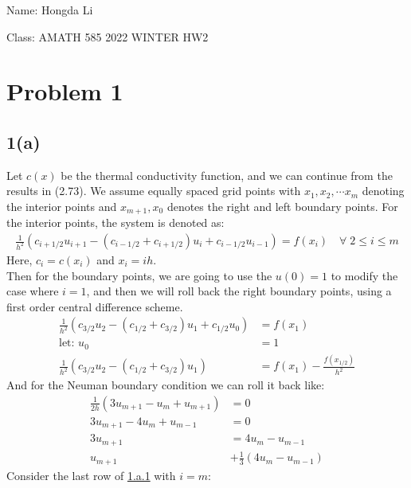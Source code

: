 \documentclass[]{article}
\begin{document}
Name: Hongda Li
\par
Class: AMATH 585 2022 WINTER HW2
\section*{Problem 1}
    \subsection*{1(a)}
        Let $c(x)$ be the thermal conductivity function, and we can continue from the results in (2.73). We assume equally spaced grid points with $x_1, x_2, \cdots x_m$ denoting the interior points and $x_{m + 1}, x_0$ denotes the right and left boundary points. For the interior points, the system is denoted as: 
        \begin{align*}\tag{1.a.1}\label{eqn:1.a.1}
            \frac{1}{h^2}(
                    c_{i + 1/2}u_{i + 1} 
                    - (c_{i - 1/2} + c_{i + 1/2})u_i +
                    c_{i - 1/2}u_{i - 1}
                ) = f(x_i)\quad \forall \; 2 \le i \le m
        \end{align*}
        Here, $c_i = c(x_i)$ and $x_i = ih$. \\
        Then for the boundary points, we are going to use the $u(0) = 1$ to modify the case where $i = 1$, and then we will roll back the right boundary points, using a first order central difference scheme. 
        \begin{align*}\tag{1.a.2}\label{eqn:1.a.2}
            \frac{1}{h^2}(
                c_{3/2}u_2 - (c_{1/2} + c_{3/2})u_1 + c_{1/2}u_0
            ) &= f(x_1)
            \\
            \text{let: }u_0 &= 1
            \\
            \frac{1}{h^2}(c_{3/2}u_2 - (c_{1/2} + c_{3/2})u_1)
            &= 
            f(x_1) - \frac{f(x_{1/2})}{h^2}
        \end{align*}
        And for the Neuman boundary condition we can roll it back like: 
        \begin{align*}\tag{1.a.3}\label{eqn:1.a.3}
            \frac{1}{2h}(3u_{m + 1} - u_m + u_{m + 1}) &= 0
            \\
            3u_{m + 1} - 4u_m + u_{m - 1} &= 0
            \\
            3u_{m + 1} &= 4u_m - u_{m - 1}
            \\
            u_{m + 1} &+ \frac{1}{3}(4u_m - u_{m - 1})
        \end{align*}
        Consider the last row of \hyperref[eqn:1.a.1]{1.a.1} with $i = m$: 
\end{document}
